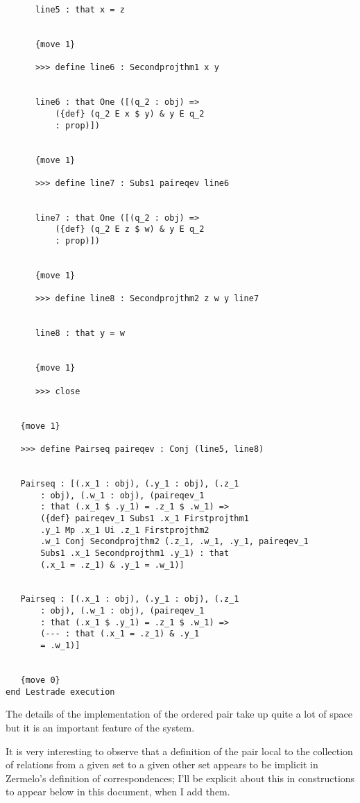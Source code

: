 \documentclass[12pt]{article}
\begin{document}
\begin{verbatim}
      line5 : that x = z


      {move 1}

      >>> define line6 : Secondprojthm1 x y


      line6 : that One ([(q_2 : obj) => 
          ({def} (q_2 E x $ y) & y E q_2 
          : prop)])


      {move 1}

      >>> define line7 : Subs1 paireqev line6


      line7 : that One ([(q_2 : obj) => 
          ({def} (q_2 E z $ w) & y E q_2 
          : prop)])


      {move 1}

      >>> define line8 : Secondprojthm2 z w y line7


      line8 : that y = w


      {move 1}

      >>> close


   {move 1}

   >>> define Pairseq paireqev : Conj (line5, line8)


   Pairseq : [(.x_1 : obj), (.y_1 : obj), (.z_1 
       : obj), (.w_1 : obj), (paireqev_1 
       : that (.x_1 $ .y_1) = .z_1 $ .w_1) => 
       ({def} paireqev_1 Subs1 .x_1 Firstprojthm1 
       .y_1 Mp .x_1 Ui .z_1 Firstprojthm2 
       .w_1 Conj Secondprojthm2 (.z_1, .w_1, .y_1, paireqev_1 
       Subs1 .x_1 Secondprojthm1 .y_1) : that 
       (.x_1 = .z_1) & .y_1 = .w_1)]


   Pairseq : [(.x_1 : obj), (.y_1 : obj), (.z_1 
       : obj), (.w_1 : obj), (paireqev_1 
       : that (.x_1 $ .y_1) = .z_1 $ .w_1) => 
       (--- : that (.x_1 = .z_1) & .y_1 
       = .w_1)]


   {move 0}
end Lestrade execution
\end{verbatim}

The details of the implementation of the ordered pair take up quite a lot of space but it is an important feature of the system.

It is very interesting to observe that a definition of the pair local to the collection of relations from a given set to a given other set appears to be implicit in Zermelo's definition of correspondences;  I'll be explicit about this in constructions to appear below in this document, when I add them.
\end{document}
